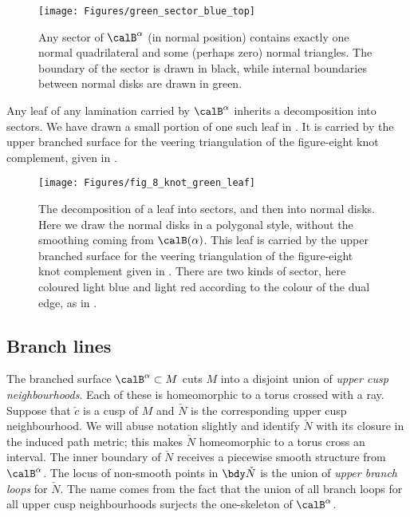 \documentclass[12pt]{amsart}
\begin{document}
\begin{figure}[htbp]
\texttt{[image: Figures/green\_sector\_blue\_top]}
\caption{Any sector of $\calB^\alpha$ (in normal position) contains exactly one normal quadrilateral and some (perhaps zero) normal triangles.  The boundary of the sector is drawn in black, while internal boundaries between normal disks are drawn in green.}
\label{Fig:Sector}
\end{figure}

Any leaf of any lamination carried by $\calB^\alpha$ inherits a decomposition into sectors.  We have drawn a small portion of one such leaf in .  It is carried by the upper branched surface for the veering triangulation of the figure-eight knot complement, given in .

\begin{figure}[htbp]
\texttt{[image: Figures/fig\_8\_knot\_green\_leaf]}
\caption{The decomposition of a leaf into sectors, and then into normal disks.  Here we draw the normal disks in a polygonal style, without the smoothing coming from $\calB(\alpha)$.  This leaf is carried by the upper branched surface for the veering triangulation of the figure-eight knot complement given in .  There are two kinds of sector, here coloured light blue and light red according to the colour of the dual edge, as in .}
\label{Fig:SectorsForFig8KnotComplement}
\end{figure}

\subsection{Branch lines}
\label{Sec:BranchLines}
The branched surface $\calB^\alpha \subset M$ cuts $M$ into a disjoint union of \emph{upper cusp neighbourhoods}.  Each of these is homeomorphic to a torus crossed with a ray.  
Suppose that $\check{c}$ is a cusp of $M$ and $\check{N}$ is the corresponding upper cusp neighbourhood.  We will abuse notation slightly and identify $\check{N}$ with its closure in the induced path metric; this makes $\check{N}$ homeomorphic to a torus cross an interval.  The inner boundary of $\check{N}$ receives a piecewise smooth structure from $\calB^\alpha$.  The locus of non-smooth points in $\bdy \check{N}$ is the union of \emph{upper branch loops} for $\check{N}$.  The name comes from the fact that the union of all branch loops for all upper cusp neighbourhoods surjects the one-skeleton of $\calB^\alpha$. 
\end{document}
